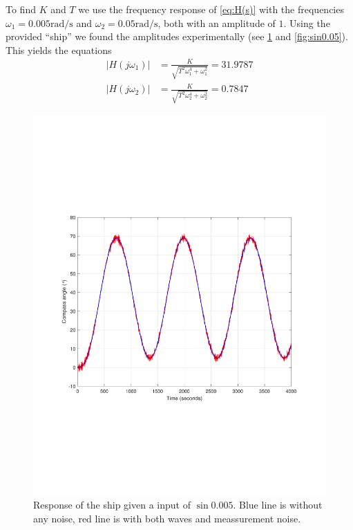 To find $K$ and $T$ we use the frequency response of \cref{eq:H(s)} with the frequencies $\omega_1 = 0.005\si{\radian\per\second}$ and $\omega_2 = 0.05\si{\radian\per\second}$, both with an amplitude of $1$. Using the provided ``ship'' we found the amplitudes experimentally (see \cref{fig:sin0.005} and \cref{fig:sin0.05}). This yields the equations
\begin{subequations}
	\begin{align}
		|H(j\omega_1)| &= \frac{K}{\sqrt{T^2\omega_1^4 + \omega_1^2}} = 31.9787 \label{eq:omega_1}\\
		|H(j\omega_2)| &= \frac{K}{\sqrt{T^2\omega_2^4 + \omega_2^2}} = 0.7847 \label{eq:omega_2}
	\end{align}
\end{subequations}

\begin{figure}
	\centering
	\includegraphics[width=\textwidth]{images/oppg1/sin0005.pdf}
	\caption{Response of the ship given a input of \ensuremath{\sin{0.005}}. 
		Blue line is without any noise, red line is with both waves and meassurement noise.}
	\label{fig:sin0.005}
\end{figure}

